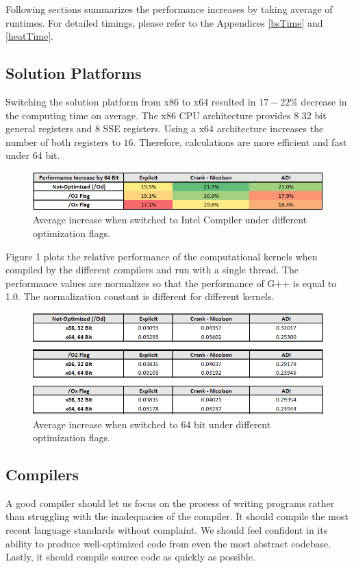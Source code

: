 \documentclass[12pt, oneside]{book}
\theoremstyle{plain}
\theoremstyle{definition}
\begin{document}
Following sections summarizes the performance increases by taking average of runtimes. For detailed timings, please refer to the Appendices \ref{bsTime} and \ref{heatTime}.

\subsection{Solution Platforms} 
Switching the solution platform from x86 to x64 resulted in $17 - 22 \%$ decrease in the computing time on average.  The x86 CPU architecture provides $8$ 32 bit general registers and $8$ SSE registers. Using a x64 architecture increases the number of both registers  to $16$. Therefore, calculations are more efficient and fast under 64 bit.

\begin{figure}[!htb]
    \centering
        \includegraphics[scale=0.8]{bitPercent.png}
    \caption{Average increase when switched to Intel Compiler under different optimization flags.}
    \label{bitPercent}
\end{figure}

Figure 1 plots the relative performance of the computational kernels when compiled by the different compilers and run with a single thread. The performance values are normalizes so that the performance of G++ is equal to 1.0. The normalization constant is different for different kernels.

\begin{figure}[!htb]
    \centering
        \includegraphics[scale=0.8]{bit.png}
    \caption{Average increase when switched to 64 bit under different optimization flags.}
\end{figure}

\subsection{Compilers} 
A good compiler should let us focus on the process of writing programs rather than struggling with the inadequacies of the compiler. It should compile the most recent language standards without complaint. We should feel confident in its ability to produce well-optimized code from even the most abstract codebase. Lastly, it should compile source code as quickly as possible.
\end{document}
